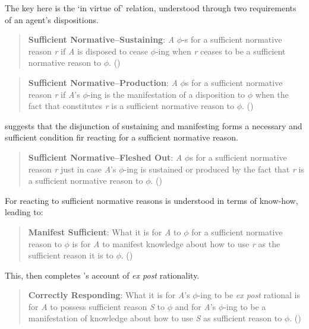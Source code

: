 \documentclass[10pt]{article}
\begin{document}
The key here is the `in virtue of' relation, understood through two requirements of an agent's dispositions.

\begin{quote}
  \textbf{Sufficient Normative–Sustaining}: \emph{A} \(\phi\)-s for a sufficient normative reason \emph{r} if \emph{A} is disposed to cease \(\phi\)-ing when \emph{r} ceases to be a sufficient normative reason to \(\phi\).\nolinebreak
  \mbox{}\hfill\mbox{(\citeyear[142]{Lord:2018aa})}
\end{quote}

\begin{quote}
  \textbf{Sufficient Normative–Production}: \emph{A} \(\phi\)s for a sufficient normative reason \emph{r} if \emph{A}'s \(\phi\)-ing is the manifestation of a disposition to \(\phi\) when the fact that constitutes \emph{r} is a sufficient normative reason to \(\phi\).\nolinebreak
  \mbox{}\hfill\mbox{(\citeyear[142]{Lord:2018aa})}
\end{quote}

\citeauthor{Lord:2018aa} suggests that the disjunction of sustaining and manifesting forms a necessary and sufficient condition fir reacting for a sufficient normative reason.

\begin{quote}
  \textbf{Sufficient Normative–Fleshed Out}: \emph{A} \(\phi\)s for a sufficient normative reason \emph{r} just in case \emph{A}'s \(\phi\)-ing is sustained or produced by the fact that \emph{r} is a sufficient normative reason to \(\phi\).\nolinebreak
  \mbox{}\hfill\mbox{(\citeyear[143]{Lord:2018aa})}
\end{quote}

For \citeauthor{Lord:2018aa} reacting to sufficient normative reasons is understood in terms of know-how, leading to:

\begin{quote}
  \textbf{Manifest Sufficient}: What it is for \emph{A} to \(\phi\) for a sufficient normative reason to \(\phi\) is for \emph{A} to manifest knowledge about how to use \emph{r} as the sufficient reason it is to \(\phi\).\nolinebreak
  \mbox{}\hfill\mbox{(\citeyear[143]{Lord:2018aa})}
\end{quote}

This, then completes \citeauthor{Lord:2018aa}'s account of \emph{ex post} rationality.

\begin{quote}
  \textbf{Correctly Responding}: What it is for \emph{A}'s \(\phi\)-ing to be \emph{ex post} rational is for \emph{A} to possess sufficient reason \emph{S} to \(\phi\) and for \emph{A}'s \(\phi\)-ing to be a manifestation of knowledge about how to use \emph{S} as sufficient reason to \(\phi\).\nolinebreak
  \mbox{}\hfill\mbox{(\citeyear[143]{Lord:2018aa})}
\end{quote}
\end{document}
